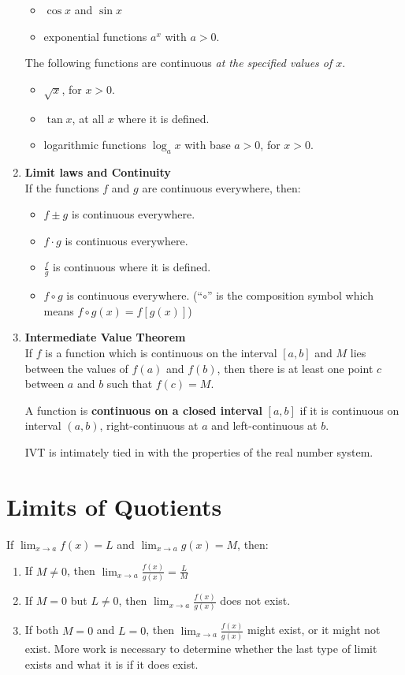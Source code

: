 \begin{enumerate}
\begin{itemize}
      \item \(\cos x\) and \(\sin x\)
      \item exponential functions \(a^x\) with \(a>0\).
    \end{itemize}\par
    \indent The following functions are continuous \textit{at the specified values of \(x\)}.
    \begin{itemize}
      \item \(\sqrt{x}\), for \(x>0\).
      \item \(\tan x\), at all \(x\) where it is defined.
      \item logarithmic functions \(\log_a x\) with base \(a>0\), for \(x>0\).
    \end{itemize}
  \item \textbf{Limit laws and Continuity}\\
    \indent If the functions \(f\) and \(g\) are continuous everywhere, then:
    \begin{itemize}
      \item \(f\pm g\) is continuous everywhere.
      \item \(f\cdot g\) is continuous everywhere.
      \item \(\frac{f}{g}\) is continuous where it is defined.
      \item \(f\circ g\) is continuous everywhere. (``\(\circ\)'' is the composition symbol which means \(f\circ g(x)=f[g(x)]\))
    \end{itemize}
  \item \textbf{Intermediate Value Theorem}\\
    \indent If \(f\) is a function which is continuous on the interval \([a,b]\) and \(M\) lies between the values of \(f(a)\) and \(f(b)\), then there is at least one point \(c\) between \(a\) and \(b\) such that \(f(c)=M\).
    \begin{note}
      A function is \textbf{continuous on a closed interval} \([a,b]\) if it is continuous on interval \((a,b)\), right-continuous at \(a\) and left-continuous at \(b\).\par
      IVT is intimately tied in with the properties of the real number system.
    \end{note}
\end{enumerate}

\section{Limits of Quotients}
If \(\lim_{x\to a}f(x)=L\) and \(\lim_{x\to a}g(x)=M\), then:
\begin{enumerate}
    \item If \(M\neq 0\), then \(\lim_{x\to a}\frac{f(x)}{g(x)}=\frac{L}{M}\)
    \item If \(M=0\) but \(L\neq 0\), then \(\lim_{x\to a}\frac{f(x)}{g(x)}\) does not exist.
    \item If both \(M=0\) and \(L=0\), then \(\lim_{x\to a}\frac{f(x)}{g(x)}\) might exist, or it might not exist. More work is necessary to determine whether the last type of limit exists and what it is if it does exist.
\end{enumerate}

